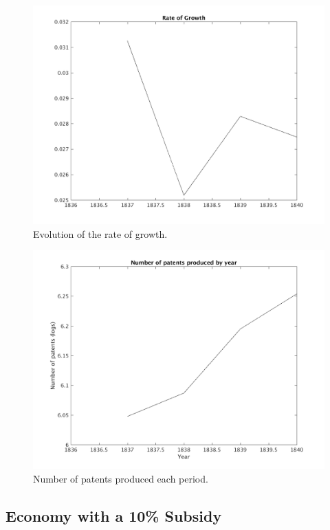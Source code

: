 \documentclass[serif]{article}
\theoremstyle{definition}
\begin{document}
\begin{figure}[h!]
\centering
\includegraphics[width=.75\textwidth]{figures/growth.png}
\caption{Evolution of the rate of growth.}
\end{figure}

\begin{figure}[h!]
\centering
\includegraphics[width=.75\textwidth]{figures/num_pats.png}
\caption{Number of patents produced each period.}
\end{figure}

\clearpage

\subsection*{Economy with a 10\% Subsidy}
\end{document}
